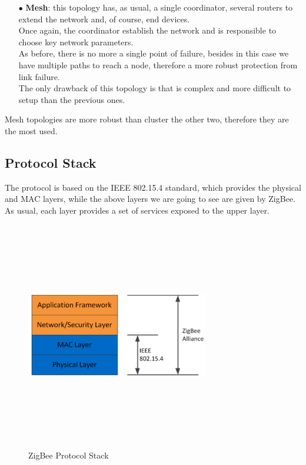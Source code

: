 \documentclass[12pt]{report}
\begin{document}
{\begin{itemize}
\item[$\bullet$] \textbf{Mesh}: this topology has, as usual, a single coordinator, several routers to extend the network and, of course, end devices.\\
Once again, the coordinator establish the network and is responsible to choose key network parameters.\\
As before, there is no more a single point of failure, besides in this case we have multiple paths to reach a node, therefore a more robust protection from link failure.\\
The only drawback of this topology is that is complex and more difficult to setup than the previous ones.\\
\end{itemize}

Mesh topologies are more robust than cluster the other two, therefore they are the most used.\\

\clearpage
\subsection{Protocol Stack}
\bigskip

The protocol is based on the IEEE 802.15.4 standard, which provides the physical and MAC layers, while the above layers we are going to see are given by ZigBee.
As usual, each layer provides a set of services exposed to the upper layer.\\

\begin{figure}[H]
\includegraphics[width=8cm,height=10cm,keepaspectratio]{zigbee_protocol_stack}
\centering
\caption{ZigBee Protocol Stack}
\end{figure}

}
\end{document}
